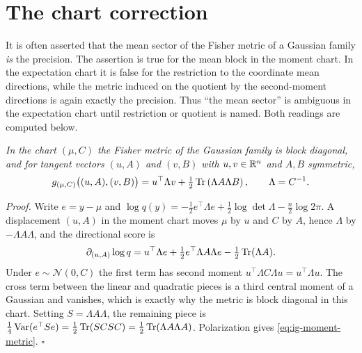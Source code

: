 \section{The chart correction}
\label{sec:ig-chart}

It is often asserted that the mean sector of the Fisher metric of a Gaussian family \emph{is} the precision. The assertion is true for the mean block in the moment chart. In the expectation chart it is false for the restriction to the coordinate mean directions, while the metric induced on the quotient by the second-moment directions is again exactly the precision. Thus ``the mean sector'' is ambiguous in the expectation chart until restriction or quotient is named. Both readings are computed below.

\medskip
{}
\emph{In the chart $(\mu,C)$ the Fisher metric of the Gaussian family is block diagonal, and for tangent vectors $(u,A)$ and $(v,B)$ with $u,v\in\mathbb R^{n}$ and $A,B$ symmetric,}
\begin{equation}
g_{(\mu,C)}\big((u,A),(v,B)\big)=u^\top\Lambda v+\tfrac12\operatorname{Tr}\left(\Lambda A\Lambda B\right),
\qquad
\Lambda=C^{-1}.
\label{eq:ig-moment-metric}
\end{equation}

\noindent\emph{Proof.} Write $e=y-\mu$ and $\log q(y)=-\tfrac12 e^\top\Lambda e+\tfrac12\log\det\Lambda-\tfrac{n}{2}\log2\pi$. A displacement $(u,A)$ in the moment chart moves $\mu$ by $u$ and $C$ by $A$, hence $\Lambda$ by $-\Lambda A\Lambda$, and the directional score is
\begin{equation}
\partial_{(u,A)}\log q=u^\top\Lambda e+\tfrac12 e^\top\Lambda A\Lambda e-\tfrac12\operatorname{Tr}(\Lambda A).
\label{eq:ig-score}
\end{equation}
Under $e\sim\mathcal N(0,C)$ the first term has second moment $u^\top\Lambda C\Lambda u=u^\top\Lambda u$. The cross term between the linear and quadratic pieces is a third central moment of a Gaussian and vanishes, which is exactly why the metric is block diagonal in this chart. Setting $S=\Lambda A\Lambda$, the remaining piece is $\tfrac14\operatorname{Var}(e^\top Se)=\tfrac12\operatorname{Tr}(SCSC)=\tfrac12\operatorname{Tr}(\Lambda A\Lambda A)$. Polarization gives \eqref{eq:ig-moment-metric}. \hfill$\square$

